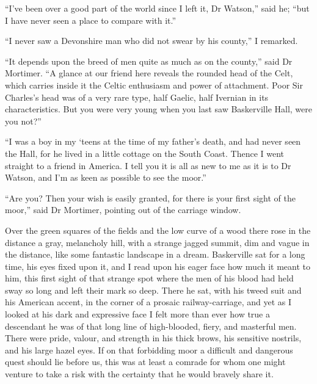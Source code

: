 \documentclass[paper=5.5in:8.5in,BCOR=7mm,twoside,DIV=calc,12pt,usegeometry,openany,chapterprefix,endperiod]{scrbook} %
\begin{document}
\enquote{I've been over a good part of the world since I left it, Dr Watson,} said he; \enquote{but I have never seen a place to compare with it.}

\enquote{I never saw a Devonshire man who did not swear by his county,} I remarked.

\enquote{It depends upon the breed of men quite as much as on the county,} said Dr Mortimer. \enquote{A glance at our friend here reveals the rounded head of the Celt, which carries inside it the Celtic enthusiasm and power of attachment. Poor Sir Charles's head was of a very rare type, half Gaelic, half Ivernian in its characteristics. But you were very young when you last saw Baskerville Hall, were you not?}

\enquote{I was a boy in my `teens at the time of my father's death, and had never seen the Hall, for he lived in a little cottage on the South Coast. Thence I went straight to a friend in America. I tell you it is all as new to me as it is to Dr Watson, and I'm as keen as possible to see the moor.}

\enquote{Are you? Then your wish is easily granted, for there is your first sight of the moor,} said Dr Mortimer, pointing out of the carriage window.


Over the green squares of the fields and the low curve of a wood there rose in the distance a gray, melancholy hill, with a strange jagged summit, dim and vague in the distance, like some fantastic landscape in a dream. Baskerville sat for a long time, his eyes fixed upon it, and I read upon his eager face how much it meant to him, this first sight of that strange spot where the men of his blood had held sway so long and left their mark so deep. There he sat, with his tweed suit and his American accent, in the corner of a prosaic railway-carriage, and yet as I looked at his dark and expressive face I felt more than ever how true a descendant he was of that long line of high-blooded, fiery, and masterful men. There were pride, valour, and strength in his thick brows, his sensitive nostrils, and his large hazel eyes. If on that forbidding moor a difficult and dangerous quest should lie before us, this was at least a comrade for whom one might venture to take a risk with the certainty that he would bravely share it.
\end{document}
